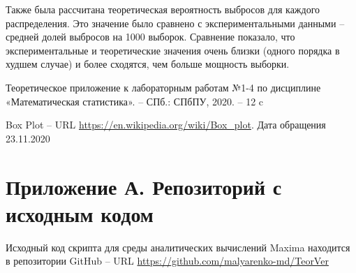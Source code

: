 \documentclass[12pt]{article}
\begin{document}
\begin{flushleft}
Также была рассчитана теоретическая вероятность выбросов для каждого распределения. Это значение было сравнено с экспериментальными данными -- средней долей выбросов на 1000 выборок. Сравнение показало, что экспериментальные и теоретические значения очень близки (одного порядка в худшем случае) и более сходятся, чем больше мощность выборки.

\newpage


\begin{thebibliography}{9}

        Теоретическое приложение к лабораторным работам №1-4 по дисциплине «Математическая статистика». -- СПб.: СПбПУ, 2020. -- 12 c

        Box Plot -- URL \url{https://en.wikipedia.org/wiki/Box_plot}. Дата обращения 23.11.2020
	
\end{thebibliography}

\newpage

\section*{Приложение А. Репозиторий с исходным кодом}

Исходный код скрипта для среды аналитических вычислений Maxima находится в репозитории GitHub -- URL \url{https://github.com/malyarenko-md/TeorVer}

\end{flushleft}
\end{document}

